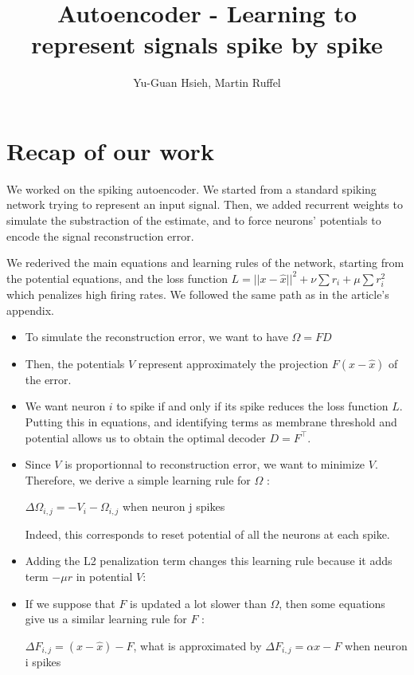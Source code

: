 \documentclass[a4paper,10pt, english]{article}
\title{Autoencoder - Learning to represent signals spike by spike}
\author{Yu-Guan Hsieh, Martin Ruffel}
\begin{document}
\maketitle

\section*{Recap of our work}

We worked on the spiking autoencoder. We started from a standard spiking network trying to represent an input signal.
Then, we added recurrent weights to simulate the substraction of the estimate, and to force neurons' potentials
to encode the signal reconstruction error. 


We rederived the main equations and learning rules of the network, starting from the potential equations, 
and the loss function $L = ||x - \hat{x}||^2 + \nu \sum{r_{i}} + \mu \sum{r_{i}^2}$ which penalizes high 
firing rates. We followed the same path as in the article's appendix.

\begin{itemize}
 \item To simulate the reconstruction error, we want to have $\Omega = FD$
 \item Then, the potentials $V$ represent approximately the projection $F(x - \hat{x})$ of the error.
 \item We want neuron $i$ to spike if and only if its spike reduces the loss function $L$. Putting this 
 in equations, and identifying terms as membrane threshold and potential allows us to obtain the optimal 
 decoder $D = F^\top$.
 \item Since $V$ is proportionnal to reconstruction error, we want to minimize $V$. Therefore, we derive 
 a simple learning rule for $\Omega$ :
 \begin{center}
  {$\Delta\Omega_{i,j} = -V_{i} -\Omega_{i,j}$} when neuron j spikes
 \end{center}
Indeed, this corresponds to reset potential of all the neurons at each spike.
 \item Adding the L2 penalization term changes this learning rule because it adds term $-\mu r$ in potential $V$:
 \begin{center}
 \end{center}
 \item If we suppose that $F$ is updated a lot slower than $\Omega$, then some equations give us a similar 
 learning rule for $F$ :
 \begin{center}
  $\Delta F_{i,j} = (x - \hat{x}) - F$, what is approximated by $\Delta F_{i,j} = \alpha x - F$ when neuron i spikes
 \end{center}
\end{itemize}
\end{document}
